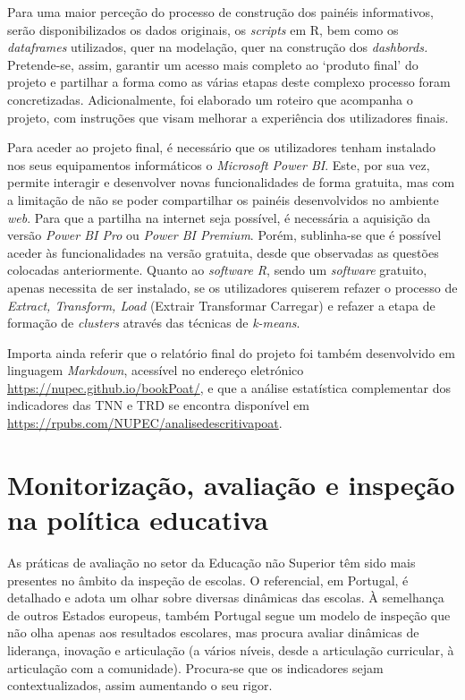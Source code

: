 \documentclass[
]{book}
\begin{document}
Para uma maior perceção do processo de construção dos painéis informativos, serão disponibilizados os dados originais, os \emph{scripts} em R, bem como os \emph{dataframes} utilizados, quer na modelação, quer na construção dos \emph{dashbords.} Pretende-se, assim, garantir um acesso mais completo ao `produto final' do projeto e partilhar a forma como as várias etapas deste complexo processo foram concretizadas. Adicionalmente, foi elaborado um roteiro que acompanha o projeto, com instruções que visam melhorar a experiência dos utilizadores finais.

Para aceder ao projeto final, é necessário que os utilizadores tenham instalado nos seus equipamentos informáticos o \emph{Microsoft Power BI}. Este, por sua vez, permite interagir e desenvolver novas funcionalidades de forma gratuita, mas com a limitação de não se poder compartilhar os painéis desenvolvidos no ambiente \emph{web}. Para que a partilha na internet seja possível, é necessária a aquisição da versão \emph{Power BI Pro} ou \emph{Power BI Premium}. Porém, sublinha-se que é possível aceder às funcionalidades na versão gratuita, desde que observadas as questões colocadas anteriormente. Quanto ao \emph{software R}, sendo um \emph{software} gratuito, apenas necessita de ser instalado, se os utilizadores quiserem refazer o processo de \emph{Extract, Transform, Load} (Extrair Transformar Carregar) e refazer a etapa de formação de \emph{clusters} através das técnicas de \emph{k-means}.

Importa ainda referir que o relatório final do projeto foi também desenvolvido em linguagem \emph{Markdown}, acessível no endereço eletrónico \url{https://nupec.github.io/bookPoat/}, e que a análise estatística complementar dos indicadores das TNN e TRD se encontra disponível em \url{https://rpubs.com/NUPEC/analisedescritivapoat}.

\hypertarget{monitorizauxe7uxe3o-avaliauxe7uxe3o-e-inspeuxe7uxe3o-na-poluxedtica-educativa}{%
\section{Monitorização, avaliação e inspeção na política educativa}\label{monitorizauxe7uxe3o-avaliauxe7uxe3o-e-inspeuxe7uxe3o-na-poluxedtica-educativa}}

As práticas de avaliação no setor da Educação não Superior têm sido mais presentes no âmbito da inspeção de escolas. O referencial, em Portugal, é detalhado e adota um olhar sobre diversas dinâmicas das escolas. À semelhança de outros Estados europeus, também Portugal segue um modelo de inspeção que não olha apenas aos resultados escolares, mas procura avaliar dinâmicas de liderança, inovação e articulação (a vários níveis, desde a articulação curricular, à articulação com a comunidade). Procura-se que os indicadores sejam contextualizados, assim aumentando o seu rigor.
\end{document}
